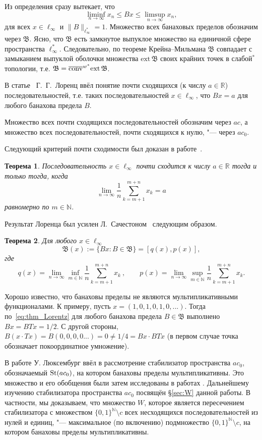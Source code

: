 \documentclass[12pt]{article}
\newtheorem{thm}{Теорема}
\def\N{{\mathbb{N}}}
\def\B{{\mathfrak{B}}}
\def\ext{{\mathrm{ext}\,}}
\begin{document}
Из определения сразу вытекает, что
$$\liminf_{n\to\infty}x_n \leqslant Bx \leqslant \limsup_{n\to\infty}x_n,$$
для всех $x\in \ell_\infty$ и $\|B\|_{\ell_\infty^*}=1$.
Множество всех банаховых пределов обозначим
 через $\mathfrak{B}$. Ясно, что $\mathfrak{B}$ есть замкнутое выпуклое
множество на единичной сфере пространства $\ell_\infty^*$. Следовательно, по теореме Крейна--Мильмана $\B$ совпадает с замыканием выпуклой оболочки множества $\ext \B$ своих крайних точек в слабой$^*$ топологии, т.е. $\B={\overline{\rm conv}}^{w^*} \ext \B$.

В статье~\cite{L} Г.~Г.~Лоренц ввёл понятие почти сходящихся (к числу $a\in \mathbb R$) последовательностей, т.е. таких последовательностей $x\in \ell_\infty$, что $Bx=a$ для любого банахова предела $B$.

Множество всех почти сходящихся последовательностей обозначим через $ac$,
а множество всех последовательностей, почти сходящихся к нулю, "--- через $ac_0$.

Следующий критерий почти сходимости был доказан в работе~\cite{L}.
\begin{thm}\label{lorentz}
Последовательность $x\in \ell_\infty$ почти сходится к числу $a\in \mathbb R$ тогда и только тогда, когда
\begin{equation}
	\label{eq:thm_Lorentz}
	\lim_{n\to\infty}\frac1n\sum_{k=m+1}^{m+n}x_k=a
\end{equation}
равномерно по $m\in{\mathbb N}$.
\end{thm}

Результат Лоренца был усилен Л.~Сачестоном~\cite{S} следующим образом.
\begin{thm}\label{sucheston}
Для любого $x\in \ell_\infty$
$$\mathfrak B (x):=\{Bx: B\in \mathfrak B\}=[q(x),p(x)],$$
где
$$
 q(x)=\lim_{n\to\infty}\inf_{m\in\mathbb N}
  \frac1n \sum_{k=m+1}^{m+n} x_k \ ,
\qquad
 p(x)=\lim_{n\to\infty}\sup_{m\in\mathbb N}
  \frac1n \sum_{k=m+1}^{m+n} x_k.
$$
\end{thm}

Хорошо известно, что банаховы пределы не являются мультипликативными функционалами.
К примеру, пусть $x=(1,0,1,0,1,0,...)$.
Тогда по~\eqref{eq:thm_Lorentz} для любого банахова предела $B\in\mathfrak{B}$ выполнено
$Bx = BTx = 1/2$.
С другой стороны, $B(x\cdot Tx) = B(0,0,0,0...) = 0 \neq 1/4 = Bx \cdot BTx$
(в первом случае точка обозначает покоординатное умножение).

В работе \cite{Luxemburg} У. Люксембург ввёл в рассмотрение стабилизатор пространства $ac_0$, обозначаемый ${\rm St}(ac_0)$,
на котором банаховы пределы мультипликативны.
Это множество и его обобщения были затем исследованы в работах \cite{Alekhno, SSU2, ASSU4}.
Дальнейшему изучению стабилизатора пространства $ac_0$ посвящён  \S\ref{sec:W} данной работы.
В частности, мы доказываем, что множество $W$,
которое является пересечением стабилизатора с множеством $\{0,1\}^\N \setminus c$
всех несходящихся последовательностей из нулей и единиц, "--- максимальное (по включению) подмножество $\{0,1\}^\N \setminus c$,
на котором банаховы пределы мультипликативны.
\end{document}
